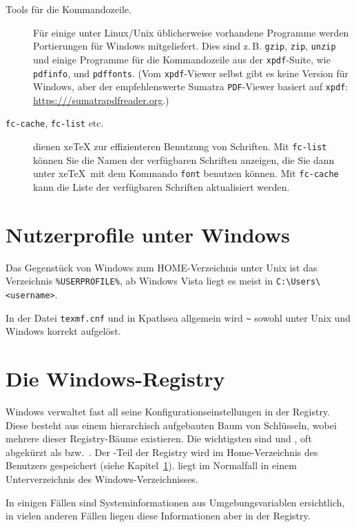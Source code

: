 \documentclass[12pt,ngerman,a4paper,fullparskip]{report}
\newcommand{\acro}[1]{\texttt{#1}}
\newcommand{\cmdname}[1]{\texttt{#1}}
\newcommand{\prog}[1]{\texttt{#1}}
\newcommand{\filename}[1]{\texttt{#1}}
\newcommand{\KPS}{Kpathsea\xspace}
\providecommand*{\XeTeX}{xe\TeX\xspace}
\begin{document}
\begin{description}
\item[Tools für die Kommandozeile.] Für einige unter Linux/Unix üblicherweise vorhandene Programme werden Portierungen für Windows mitgeliefert. Dies sind z.\,B. \cmdname{gzip}, \cmdname{zip}, \cmdname{unzip} und einige Programme für die Kommandozeile aus der
   \cmdname{xpdf}-Suite, wie \cmdname{pdfinfo}, und \cmdname{pdffonts}.  (Vom
   \cmdname{xpdf}-Viewer selbst gibt es keine Version für Windows, aber der empfehlenswerte 
   Sumatra \acro{PDF}-Viewer basiert auf \cmdname{xpdf}:
   \url{https:///sumatrapdfreader.org}.)
 \item[\texttt{fc-cache}, \texttt{fc-list} etc.] dienen \XeTeX{} zur effizienteren Benutzung von Schriften. Mit \prog{fc-list} können Sie die Namen der
   verfügbaren Schriften anzeigen, die Sie dann unter \XeTeX\ mit dem
   Kommando \texttt{font} benutzen können. Mit \prog{fc-cache} kann die Liste
   der verfügbaren Schriften aktualisiert werden.
\end{description}


\section{Nutzerprofile unter Windows}
\label{sec:winhome}

Das Gegenstück von Windows zum HOME-Verzeichnis unter Unix ist das
Verzeichnis \verb|%USERPROFILE%|, ab Windows Vista liegt es meist in \verb|C:\Users\<username>|.

In der Datei  \filename{texmf.cnf} und in \KPS{} allgemein wird \verb|~| 
sowohl unter Unix und Windows korrekt aufgelöst.

\section{Die Windows-Registry}
\label{sec:registry}

Windows verwaltet fast all seine Konfigurationseinstellungen in der Registry. Diese besteht aus einem hierarchisch aufgebauten Baum von Schlüsseln, wobei mehrere dieser Registry-Bäume existieren. Die wichtigsten sind  und , oft abgekürzt als  bzw.\ . Der -Teil der Registry wird im Home-Verzeichnis des Benutzers gespeichert (siehe Kapitel~\ref{sec:winhome}).  liegt im
Normalfall in einem Unterverzeichnis des Windows-Verzeichnisses.

In einigen Fällen sind Systeminformationen aus Umgebungsvariablen ersichtlich, in vielen anderen Fällen liegen diese Informationen aber in der Registry.
\end{document}
